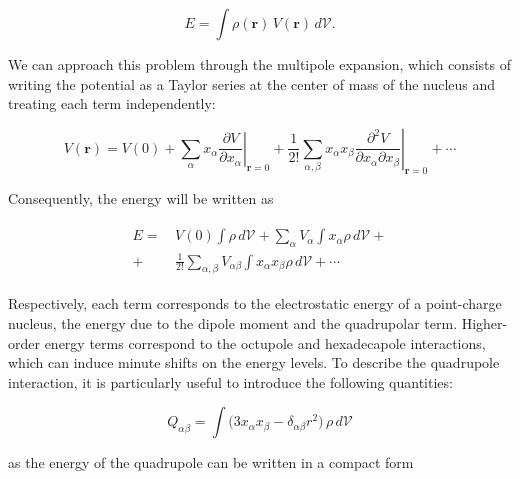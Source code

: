 \begin{equation}
    E = \int \rho(\mathbf{r})\, V(\mathbf{r})\, d\mathcal{V}.
\end{equation}

We can approach this problem through the multipole expansion, which consists of writing the potential as a Taylor series at the center of mass of the nucleus and treating each term independently:

\begin{equation}
V(\mathbf{r}) = V(0) 
+ \sum_{\alpha} x_{\alpha} 
\left. \frac{\partial V}{\partial x_{\alpha}} \right|_{\mathbf{r}=0}
+ \frac{1}{2!} \sum_{\alpha,\beta} x_{\alpha} x_{\beta} 
\left. \frac{\partial^2 V}{\partial x_{\alpha} \partial x_{\beta}} \right|_{\mathbf{r}=0}
+ \cdots
\end{equation}

Consequently, the energy will be written as 

\begin{align}
\begin{split}
E =&\, V(0) \int \rho \, d\mathcal{V} 
+ \sum_{\alpha} V_{\alpha} \int x_{\alpha} \rho \, d\mathcal{V} +\\
+&\, \frac{1}{2!} \sum_{\alpha,\beta} V_{\alpha \beta} \int x_{\alpha} x_{\beta} \rho \, d\mathcal{V} 
+ \cdots
\end{split}
\end{align}

Respectively, each term corresponds to the electrostatic energy of a point-charge nucleus, the energy due to the dipole moment  and the quadrupolar term. Higher-order energy terms correspond to the octupole and hexadecapole interactions, which can induce minute shifts on the energy levels. To describe the quadrupole interaction, it is particularly useful to introduce the following quantities:

\begin{equation}
    Q_{\alpha \beta} = \int \big( 3 x_{\alpha} x_{\beta} - \delta_{\alpha \beta} r^{2} \big) \, \rho \, d\mathcal{V}
\end{equation}

as the energy of the quadrupole can be written in a compact form

